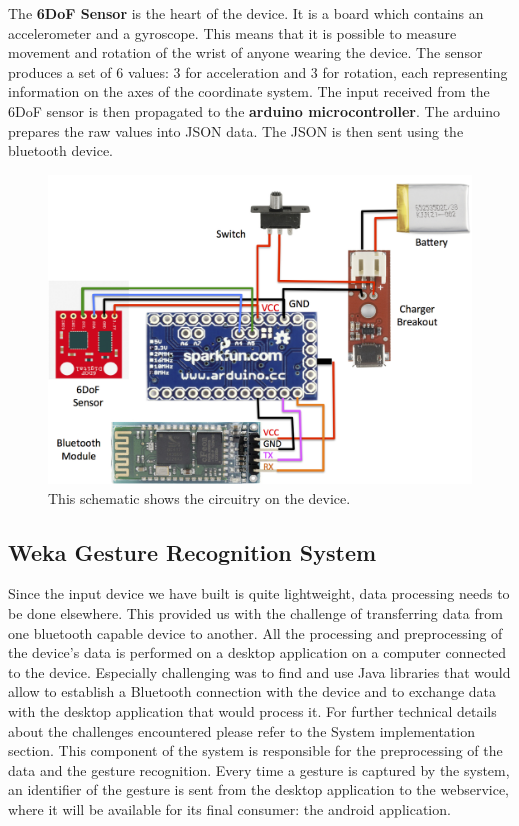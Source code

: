 The \textbf{6DoF Sensor} is the heart of the device.
It is a board which contains an accelerometer and a gyroscope.
This means that it is possible to measure movement and rotation of the wrist of anyone wearing the device.
The sensor produces a set of 6 values: 3 for acceleration and 3 for rotation, each representing information on the axes of the coordinate system.
The input received from the 6DoF sensor is then propagated to the \textbf{arduino microcontroller}.
The arduino prepares the raw  values into JSON data. The JSON is then sent using the bluetooth device.

\begin{figure}[!h]
\centering
\includegraphics[width=0.9\columnwidth]{img/device_schematic}
\caption{This schematic shows the circuitry on the device.}
\label{fig:figure1}
\end{figure}

\subsection{Weka Gesture Recognition System}
Since the input device we have built is quite lightweight, data processing needs to be done elsewhere.
This provided us with the challenge of transferring data from one bluetooth capable device to another.
All the processing and preprocessing of the device's data is performed on a desktop application on a 
computer connected to the device.
Especially challenging was to find and use Java libraries that would allow to establish a Bluetooth 
connection with the device and to exchange data with the desktop application that would process it. 
For further technical details about the challenges encountered please refer to the System implementation section. 
This component of the system is responsible for the preprocessing of the data and the gesture recognition. 
Every time a gesture is captured by the system, an identifier of the gesture is sent from the desktop application to the webservice, 
where it will be available for its final consumer: the android application.

